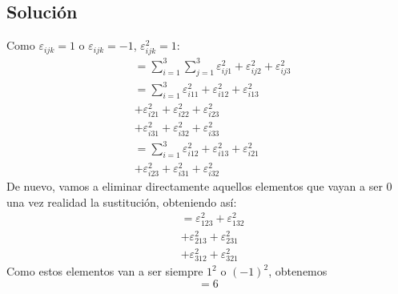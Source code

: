 \documentclass[12pt,reqno]{article}
\begin{document}
	\subsection*{Solución}
	Como $\varepsilon_{ijk}=1$ o $\varepsilon_{ijk}=-1$, $\varepsilon_{ijk}^{2}=1$:
	\begin{equation*}
		\begin{split}
			&= \sum_{i=1}^{3}\sum_{j=1}^{3}\varepsilon_{ij 1}^{2}+\varepsilon_{ij 2}^{2}+\varepsilon_{ij 3}^{2}\\
			&= \sum_{i=1}^{3}\varepsilon_{i 11}^{2}+\varepsilon_{i 12}^{2}+\varepsilon_{i 13}^{2}\\
			&+ \varepsilon_{i 21}^{2}+\varepsilon_{i 22}^{2}+\varepsilon_{i 23}^{2}\\
			&+ \varepsilon_{i 31}^{2}+\varepsilon_{i 32}^{2}+\varepsilon_{i 33}^{2}\\
			&= \sum_{i=1}^{3} \varepsilon_{i 12}^{2}+\varepsilon_{i 13}^{2}+\varepsilon_{i 21}^{2}\\
			&+ \varepsilon_{i 23}^{2}+\varepsilon_{i 31}^{2}+\varepsilon_{i 32}^{2}
		\end{split}
	\end{equation*}
	De nuevo, vamos a eliminar directamente aquellos elementos que vayan a ser $0$ una vez realidad la sustitución, obteniendo así:
	\begin{equation*}
		\begin{split}
			&= \varepsilon_{123}^{2}+\varepsilon_{132}^{2}\\
			&+ \varepsilon_{213}^{2}+\varepsilon_{231}^{2}\\
			&+ \varepsilon_{312}^{2}+\varepsilon_{321}^{2}
		\end{split}
	\end{equation*}
	Como estos elementos van a ser siempre $1 ^{2}$ o $(-1) ^{2}$, obtenemos
	\[
		= 6
	\]
\end{document}
